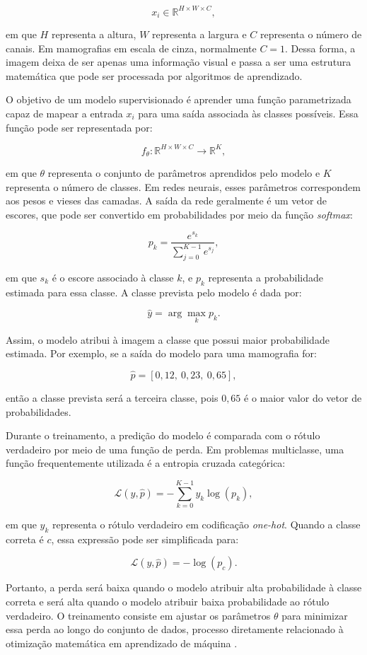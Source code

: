 \documentclass[
    12pt,
    openright,
    oneside,
    a4paper,
    english,
    brazil
]{abntex2}
\begin{document}
\[
x_i \in \mathbb{R}^{H \times W \times C},
\]

em que \(H\) representa a altura, \(W\) representa a largura e \(C\) representa o número de canais. Em mamografias em escala de cinza, normalmente \(C=1\). Dessa forma, a imagem deixa de ser apenas uma informação visual e passa a ser uma estrutura matemática que pode ser processada por algoritmos de aprendizado.

O objetivo de um modelo supervisionado é aprender uma função parametrizada capaz de mapear a entrada \(x_i\) para uma saída associada às classes possíveis. Essa função pode ser representada por:

\[
f_{\theta}: \mathbb{R}^{H \times W \times C} \rightarrow \mathbb{R}^{K},
\]

em que \(\theta\) representa o conjunto de parâmetros aprendidos pelo modelo e \(K\) representa o número de classes. Em redes neurais, esses parâmetros correspondem aos pesos e vieses das camadas. A saída da rede geralmente é um vetor de escores, que pode ser convertido em probabilidades por meio da função \textit{softmax}:

\[
p_k =
\frac{e^{s_k}}
{\sum_{j=0}^{K-1} e^{s_j}},
\]

em que \(s_k\) é o escore associado à classe \(k\), e \(p_k\) representa a probabilidade estimada para essa classe. A classe prevista pelo modelo é dada por:

\[
\hat{y} =
\arg\max_k p_k.
\]

Assim, o modelo atribui à imagem a classe que possui maior probabilidade estimada. Por exemplo, se a saída do modelo para uma mamografia for:

\[
\hat{p} = [0{,}12,\ 0{,}23,\ 0{,}65],
\]

então a classe prevista será a terceira classe, pois \(0{,}65\) é o maior valor do vetor de probabilidades.

Durante o treinamento, a predição do modelo é comparada com o rótulo verdadeiro por meio de uma função de perda. Em problemas multiclasse, uma função frequentemente utilizada é a entropia cruzada categórica:

\[
\mathcal{L}(y,\hat{p}) =
-\sum_{k=0}^{K-1}
y_k \log(p_k),
\]

em que \(y_k\) representa o rótulo verdadeiro em codificação \textit{one-hot}. Quando a classe correta é \(c\), essa expressão pode ser simplificada para:

\[
\mathcal{L}(y,\hat{p}) =
-\log(p_c).
\]

Portanto, a perda será baixa quando o modelo atribuir alta probabilidade à classe correta e será alta quando o modelo atribuir baixa probabilidade ao rótulo verdadeiro. O treinamento consiste em ajustar os parâmetros \(\theta\) para minimizar essa perda ao longo do conjunto de dados, processo diretamente relacionado à otimização matemática em aprendizado de máquina \cite{deisenroth2020mathematics,goodfellow2016deep}.
\end{document}

